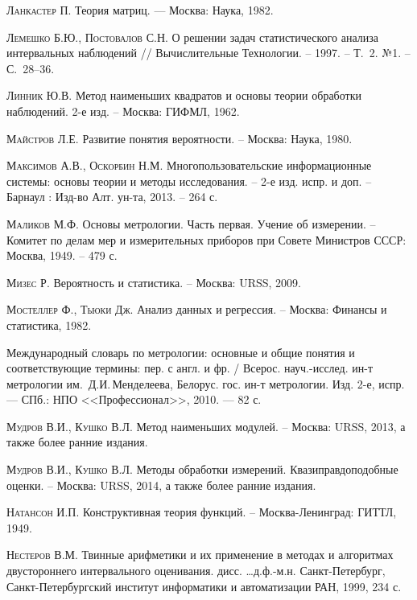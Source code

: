 \documentclass[a5paper,openany]{book}
\begin{document}
\begin{thebibliography}{999}
\textsc{Ланкастер П.} Теория матриц. --- Москва: Наука, 1982. 
  
\textsc{Лемешко Б.Ю., Постовалов С.Н.} 
О решении задач статистического анализа интервальных наблюдений // Вычислительные 
Технологии. -- 1997. -- Т.~2. №1. -- С.~28–36. 
  
\textsc{Линник Ю.В.} Метод наименьших квадратов и основы теории обработки 
наблюдений. 2-е изд. -- Москва: ГИФМЛ, 1962. 
  
\textsc{Майстров Л.Е.} Развитие понятия вероятности. -- Москва: Наука, 1980.   
  
\textsc{Максимов А.В., Оскорбин Н.М.}
Многопользовательские информационные системы: основы теории и методы исследования. 
-- 2-е изд. испр. и доп. -- Барнаул : Изд-во Алт. ун-та, 2013. -- 264 с.
  
\textsc{Маликов М.Ф.} Основы метрологии. Часть первая. Учение об измерении. 
-- Комитет по делам мер и измерительных приборов при Совете Министров СССР: 
Москва, 1949. -- 479 с. 
  
\textsc{Мизес Р.} Вероятность и статистика. -- Москва: URSS, 2009. 
  
\textsc{Мостеллер Ф., Тьюки Дж.} Анализ данных и регрессия. -- Москва: Финансы 
и статистика, 1982. 
  
Международный словарь по метрологии: основные и общие понятия и соответствующие 
термины: пер. с англ. и фр. / Всерос. науч.-исслед. ин-т метрологии им.~Д.И.\,Менделеева, 
Белорус. гос. ин-т метрологии. Изд. 2-е, испр. — СПб.: НПО <<Профессионал>>, 2010. — 
82 с.  
  
\textsc{Мудров В.И., Кушко В.Л.} Метод наименьших модулей. -- Москва: URSS, 2013, 
а также более ранние издания. 
    
\textsc{Мудров В.И., Кушко В.Л.} Методы обработки измерений. Квазиправдоподобные оценки. 
-- Москва: URSS, 2014, а также более ранние издания. 
  
\textsc{Натансон И.П.} Конструктивная теория функций. -- Москва-Ленинград: ГИТТЛ, 1949. 
  
\textsc{Нестеров В.М.} Твинные арифметики и их применение в методах и алгоритмах 
двустороннего интервального оценивания. дисс. \ldots д.ф.-м.н. Санкт-Петербург, 
Санкт-Петербургский институт информатики и автоматизации РАН, 1999, 234 с. 
    

\end{thebibliography}
\end{document}
